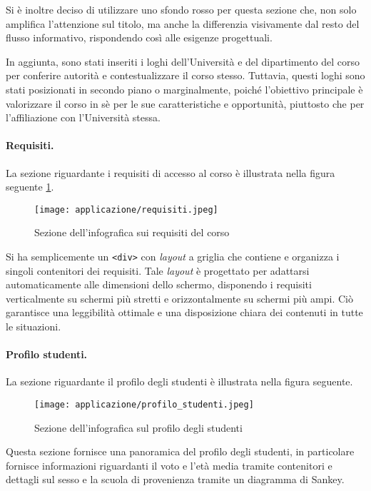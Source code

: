Si è inoltre deciso di utilizzare uno sfondo rosso per questa sezione che, non solo amplifica l'attenzione sul titolo, ma anche la differenzia
visivamente dal resto del flusso informativo, rispondendo così alle esigenze progettuali.
 
In aggiunta, sono stati inseriti i loghi dell'Università e del dipartimento del corso per conferire autorità e contestualizzare il corso stesso. 
Tuttavia, questi loghi sono stati posizionati in secondo piano o marginalmente, poiché l'obiettivo principale è valorizzare il corso in sè per le sue caratteristiche e opportunità, 
piuttosto che per l'affiliazione con l'Università stessa.

\paragraph{Requisiti.} La sezione riguardante i requisiti di accesso al corso è illustrata nella figura seguente \ref{fig:requisiti}.
\begin{figure}[H] 
    \centering 
    \texttt{[image: applicazione/requisiti.jpeg]} 
    \caption{Sezione dell'infografica sui requisiti del corso}
    \label{fig:requisiti}
\end{figure}
\noindent Si ha semplicemente un \texttt{<div>} con \emph{layout} a griglia che contiene e organizza i singoli contenitori dei requisiti.
Tale \emph{layout} è progettato per adattarsi automaticamente alle dimensioni dello schermo, disponendo i requisiti verticalmente su schermi 
più stretti e orizzontalmente su schermi più ampi. Ciò garantisce una leggibilità ottimale e una disposizione 
chiara dei contenuti in tutte le situazioni.

\paragraph{Profilo studenti.} La sezione riguardante il profilo degli studenti è illustrata nella figura seguente. 
\begin{figure}[H] 
    \centering 
    \texttt{[image: applicazione/profilo\_studenti.jpeg]} 
    \caption{Sezione dell'infografica sul profilo degli studenti}
    \label{fig:app_profilo_stud}
\end{figure}
\noindent Questa sezione fornisce una panoramica del profilo degli studenti, in particolare fornisce informazioni riguardanti il voto e l'età media 
tramite contenitori e dettagli sul sesso e la scuola di provenienza tramite un diagramma di Sankey.

